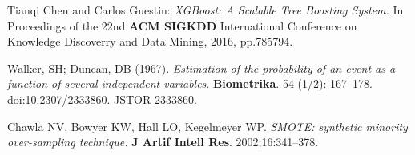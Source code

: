 \begin{thebibliography}{9}
Tianqi Chen and Carlos Guestin: \textit{XGBoost: A Scalable Tree Boosting System.} In Proceedings of the 22nd \textbf{ACM SIGKDD} International Conference on Knowledge Discoverry and Data Mining, 2016, pp.785794.

Walker, SH; Duncan, DB (1967). \textit{Estimation of the probability of an event as a function of several independent variables}. \textbf{Biometrika}. 54 (1/2): 167–178. doi:10.2307/2333860. JSTOR 2333860.

Chawla NV, Bowyer KW, Hall LO, Kegelmeyer WP. \textit{SMOTE: synthetic minority over-sampling technique.} \textbf{J Artif Intell Res}. 2002;16:341–378.


\end{thebibliography}